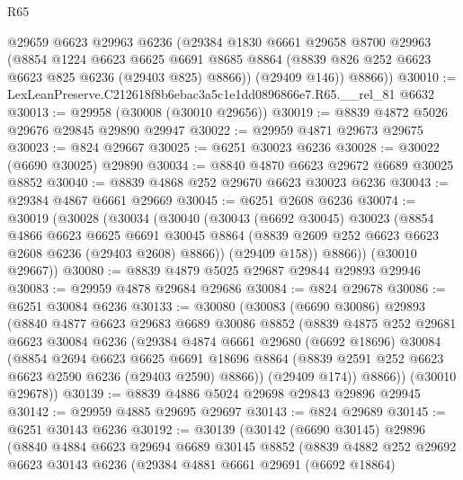 \begin{lexlean}{R65}
\begin{coremodule}
{        @29659
        @6623
        @29963
        @6236
        (@29384
          @1830
          @6661
          @29658
          @8700
          @29963
          (@8854
            @1224
            @6623
            @6625
            @6691
            @8685
            @8864
            (@8839 @826 @252 @6623 @6623 @825 @6236 (@29403 @825) @8866))
          (@29409 @146))
        @8866))
@30010 := LexLeanPreserve.C212618f8b6ebac3a5c1e1dd0896866e7.R65.__rel_81 @6632
@30013 := @29958 (@30008 (@30010 @29656))
@30019 := @8839 @4872 @5026 @29676 @29845 @29890 @29947
@30022 := @29959 @4871 @29673 @29675
@30023 := @824 @29667
@30025 := @6251 @30023 @6236
@30028 := @30022 (@6690 @30025) @29890
@30034 := @8840 @4870 @6623 @29672 @6689 @30025 @8852
@30040 := @8839 @4868 @252 @29670 @6623 @30023 @6236
@30043 := @29384 @4867 @6661 @29669
@30045 := @6251 @2608 @6236
@30074 := @30019
    (@30028
      (@30034
        (@30040
          (@30043
            (@6692 @30045)
            @30023
            (@8854
              @4866
              @6623
              @6625
              @6691
              @30045
              @8864
              (@8839 @2609 @252 @6623 @6623 @2608 @6236 (@29403 @2608) @8866))
            (@29409 @158))
          @8866))
      (@30010 @29667))
@30080 := @8839 @4879 @5025 @29687 @29844 @29893 @29946
@30083 := @29959 @4878 @29684 @29686
@30084 := @824 @29678
@30086 := @6251 @30084 @6236
@30133 := @30080
    (@30083
      (@6690 @30086)
      @29893
      (@8840
        @4877
        @6623
        @29683
        @6689
        @30086
        @8852
        (@8839
          @4875
          @252
          @29681
          @6623
          @30084
          @6236
          (@29384
            @4874
            @6661
            @29680
            (@6692 @18696)
            @30084
            (@8854
              @2694
              @6623
              @6625
              @6691
              @18696
              @8864
              (@8839 @2591 @252 @6623 @6623 @2590 @6236 (@29403 @2590) @8866))
            (@29409 @174))
          @8866))
      (@30010 @29678))
@30139 := @8839 @4886 @5024 @29698 @29843 @29896 @29945
@30142 := @29959 @4885 @29695 @29697
@30143 := @824 @29689
@30145 := @6251 @30143 @6236
@30192 := @30139
    (@30142
      (@6690 @30145)
      @29896
      (@8840
        @4884
        @6623
        @29694
        @6689
        @30145
        @8852
        (@8839
          @4882
          @252
          @29692
          @6623
          @30143
          @6236
          (@29384
            @4881
            @6661
            @29691
            (@6692 @18864)
}
\end{coremodule}
\end{lexlean}
